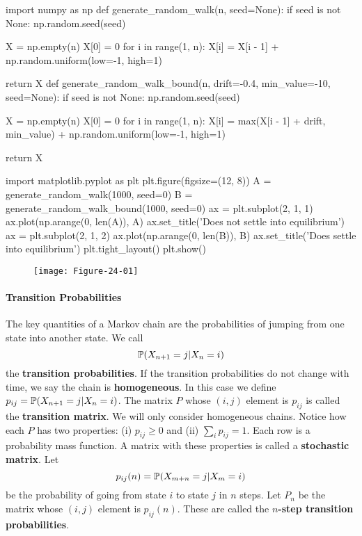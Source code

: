 \begin{python}
import numpy as np
def generate_random_walk(n, seed=None):
    if seed is not None:
        np.random.seed(seed)
    
    X = np.empty(n)
    X[0] = 0
    for i in range(1, n):
        X[i] = X[i - 1] + np.random.uniform(low=-1, high=1)
    
    return X
def generate_random_walk_bound(n, drift=-0.4, min_value=-10, seed=None):
    if seed is not None:
        np.random.seed(seed)
    
    X = np.empty(n)
    X[0] = 0
    for i in range(1, n):
        X[i] = max(X[i - 1] + drift, min_value) + np.random.uniform(low=-1, high=1)
    
    return X
\end{python}

\begin{python}
import matplotlib.pyplot as plt
plt.figure(figsize=(12, 8))
A = generate_random_walk(1000, seed=0)
B = generate_random_walk_bound(1000, seed=0)
ax = plt.subplot(2, 1, 1)
ax.plot(np.arange(0, len(A)), A)
ax.set_title('Does not settle into equilibrium')
ax = plt.subplot(2, 1, 2)
ax.plot(np.arange(0, len(B)), B)
ax.set_title('Does settle into equilibrium')
plt.tight_layout()
plt.show()
\end{python}

\begin{figure}[H]
\centering
\texttt{[image: Figure-24-01]}
\end{figure}

\paragraph{Transition Probabilities}\label{transition-probabilities}
The key quantities of a Markov chain are the probabilities of jumping
from one state into another state.
We call
\[
\operatorname{\mathbb{P}}(X_{n+1} = j | X_{n} = i)
\]
the \textbf{transition probabilities}. If the transition probabilities
do not change with time, we say the chain is \textbf{homogeneous}. In
this case we define \(p_{ij} = \operatorname{\mathbb{P}}(X_{n+1} = j | X_{n} = i)\). The
matrix \(P\) whose \((i, j)\) element is \(p_{ij}\) is called the
\textbf{transition matrix}.
We will only consider homogeneous chains. Notice how each \(P\) has two
properties: (i) \(p_{ij} \geq 0\) and (ii) \(\sum_{i} p_{ij} = 1\). Each
row is a probability mass function. A matrix with these properties is
called a \textbf{stochastic matrix}.
Let
\[
p_{ij}(n) = \operatorname{\mathbb{P}}(X_{m + n} = j | X_{m} = i)
\]
be the probability of going from state \(i\) to state \(j\) in \(n\)
steps. Let \(P_{n}\) be the matrix whose \((i, j)\) element is
\(p_{ij}(n)\). These are called the \textbf{\(n\)-step transition
probabilities}.

